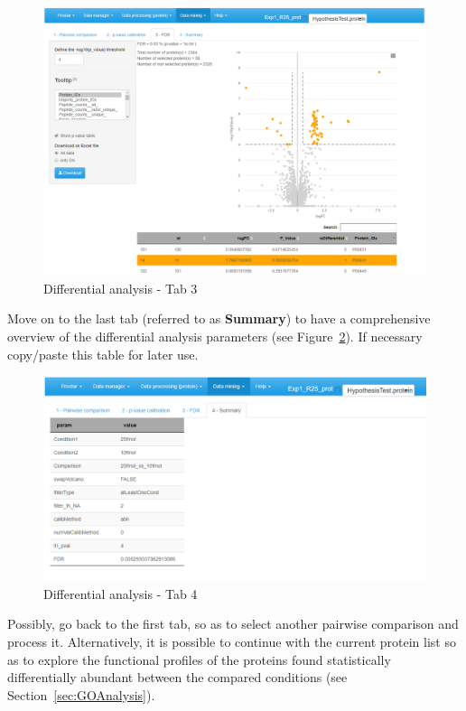 \documentclass[12pt]{article}
\begin{document}
\begin {figure}
\includegraphics[width=\textwidth]{images/fdr-thresh.png}
\caption{Differential analysis - Tab 3}\label{fig:fdr-thresh}
\end {figure}

Move on to the last tab (referred to as \textbf{Summary}) to have a comprehensive overview of the differential analysis parameters (see Figure~\ref{fig:anadiffsum}). If necessary copy/paste this table for later use.

\begin {figure}
\includegraphics[width=\textwidth]{images/anadiffsum.png}
\caption{Differential analysis - Tab 4}\label{fig:anadiffsum}
\end {figure}

Possibly, go back to the first tab, so as to select another pairwise comparison and process it. Alternatively, it is possible to continue with the current protein list so as to explore the functional profiles of the proteins found statistically differentially abundant between the compared conditions (see Section~\ref{sec:GOAnalysis}).
\end{document}

